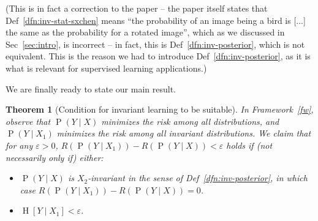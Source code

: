 \documentclass[12pt]{article}
\newcommand{\Ent}[1]{\operatorname{H}\left[#1\right]}
\newcommand{\Prob}[1]{\operatorname{P}\left(#1\right)}
\newtheorem{thm}{Theorem}[section]
\theoremstyle{definition}
\numberwithin{equation}{section}
\numberwithin{figure}{section}
\numberwithin{table}{section}
\begin{document}
(This is in fact a correction to the paper \cite{sxchen} -- the paper itself states that Def~\ref{dfn:inv-stat-sxchen} means ``the probability of an image being a bird is [...] the same as the probability for a rotated image'', which as we discussed in Sec~\ref{sec:intro}, is incorrect -- in fact, this is Def~\ref{dfn:inv-posterior}, which is not equivalent. This is the reason we had to introduce Def~\ref{dfn:inv-posterior}, as it is what is relevant for supervised learning applications.)

We are finally ready to state our main result.

\begin{thm}[Condition for invariant learning to be suitable]
    \label{thm:main}
    In Framework~\ref{fw}, observe that $\Prob{Y\mid X}$ minimizes the risk among all distributions, and $\Prob{Y\mid X_1}$ minimizes the risk among all invariant distributions. We claim that for any $\varepsilon > 0$, $R(\Prob{Y\mid X_1}) - R(\Prob{Y\mid X}) < \varepsilon$ holds if (not necessarily only if) either:
    \begin{itemize}
        \item $\Prob{Y\mid X}$ is $X_2$-invariant in the sense of Def~\ref{dfn:inv-posterior}, in which case $R(\Prob{Y\mid X_1}) - R(\Prob{Y\mid X}) = 0$. 
        \item $\Ent{Y\mid X_1}<\varepsilon$.
    \end{itemize}
\end{thm}
\end{document}
